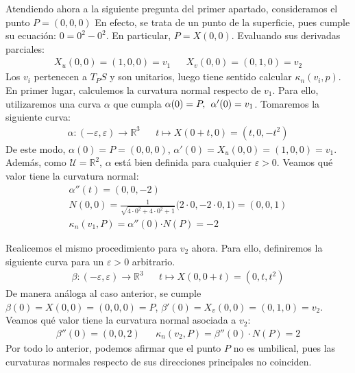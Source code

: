 \documentclass{article}
\begin{document}
\newpage
Atendiendo ahora a la siguiente pregunta del primer apartado, consideramos el punto $P = (0,0,0)$
En efecto, se trata de un punto de la superficie, pues cumple su ecuación: $0 = 0^2 - 0^2$.
En particular, $P = X(0,0)$. Evaluando sus derivadas parciales:
\begin{align*}
    X_u(0,0) = (1,0,0) = v_1 &&
    X_v(0,0) = (0,1,0) = v_2
\end{align*}
\noindent Los $v_i$ pertenecen a $T_PS$ y son unitarios, luego tiene sentido calcular $\kappa_n(v_i, p)$.
En primer lugar, calculemos la curvatura normal respecto de $v_1$. Para ello, utilizaremos una curva $\alpha$
que cumpla $\alpha(0) = P, \hspace{1.5mm} \alpha'(0) = v_1$. Tomaremos la siguiente curva:
\begin{align*}
    \alpha: (-\varepsilon, \varepsilon) \longrightarrow \mathbb{R}^3 &&
    t \longmapsto X(0 + t, 0) = (t, 0, -t^2)
\end{align*}
\noindent De este modo, $\alpha(0) = P = (0,0,0)$, $\alpha'(0) = X_u(0,0) = (1,0,0) = v_1$.
Además, como $\mathcal{U} = \mathbb{R}^2$, $\alpha$ está bien definida para cualquier $\varepsilon > 0$.
Veamos qué valor tiene la curvatura normal: \vspace{2mm}
\begin{align*}
    &\alpha''(t) =  (0,0,-2) \\
    &N(0,0) = \frac{1}{\sqrt{4\cdot0^2 + 4\cdot 0^2 + 1}} \Big(2\cdot 0, -2 \cdot 0, 1\Big)
     = (0,0,1) \\[2ex]
    & \kappa_n(v_1, P) = \alpha''(0) \boldsymbol{\cdot} N(P) = -2&
\end{align*}

\vspace{2mm}
Realicemos el mismo procedimiento para $v_2$ ahora. Para ello, definiremos la siguiente curva para
un $\varepsilon > 0$ arbitrario.
\begin{align*}
    \beta: (-\varepsilon, \varepsilon) \longrightarrow \mathbb{R}^3 &&
    t \longmapsto X(0, 0 + t) = (0, t, t^2)
\end{align*}
\noindent De manera análoga al caso anterior, se cumple
$\beta(0) = X(0,0) = (0,0,0) = P$,  $\beta'(0) = X_v(0,0) = (0,1,0) = v_2$.
Veamos qué valor tiene la curvatura normal asociada a $v_2$:
\begin{align*}
    \beta''(0) = (0,0,2) &&
    \kappa_n(v_2, P) = \beta''(0) \cdot N(P) = 2
\end{align*}
Por todo lo anterior, podemos afirmar que el punto $P$ no es umbilical, pues
las curvaturas normales respecto de sus direcciones principales no coinciden.
\end{document}
